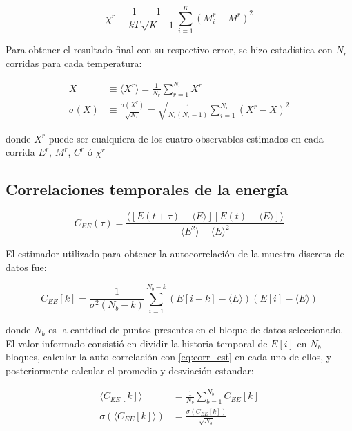 \documentclass[a4paper,12pt]{article}
\begin{document}
\begin{equation}
 \chi^r \equiv  \frac{1}{kT} \frac{1}{\sqrt{K-1}} \sum_{i=1}^K \left(
 M_i^r -  M^r \right)^2
\end{equation}

Para obtener el resultado final con su respectivo error, se hizo estadística 
con $N_r$ corridas para cada temperatura:

\begin{subequations}
\begin{align}
X & \equiv \langle X^r \rangle = \frac{1}{N_r} 
\sum_{r=1}^{N_r} X^r \\
\sigma(X) & \equiv \frac{\sigma(X^r)}{\sqrt{N_r}} =  \sqrt{\frac{1}{N_r(N_r-1)} 
\sum_{i=1}^{N_r} \left( 
 X^r -  X \right)^2}
\end{align}
\end{subequations}

\noindent donde $X^r$ puede ser cualquiera de los cuatro observables estimados 
en cada corrida $E^r$, $M^r$, $C^r$ ó $\chi^r$

\subsection{Correlaciones temporales de la energía}

\begin{equation}\label{eq:corr_teo}
C_{EE}(\tau) = \frac{\langle \left[E(t+\tau)-\langle 
E\rangle\right]\left[E(t)-\langle E \rangle\right] \rangle
}{\langle E^2\rangle - \langle E \rangle ^2}
\end{equation}

El estimador utilizado para obtener la autocorrelación de la muestra discreta 
de datos fue:

\begin{equation}\label{eq:corr_est}
C_{EE}[k] = \frac{1}{\sigma^2(N_b-k)} \sum_{i=1}^{N_b - k}\left(E[i+k] - 
\langle E \rangle\right)\left(E[i]-\langle E\rangle\right)
\end{equation}

\noindent donde $N_b$ es la cantdiad de puntos presentes en el bloque de datos 
seleccionado. El valor informado consistió en dividir la historia temporal de 
$E[i]$ en $N_b$ bloques, calcular la auto-correlación con \eqref{eq:corr_est} 
en cada uno de ellos, y posteriormente calcular el promedio y desviación 
estandar:

\begin{subequations}
\begin{align}
\langle C_{EE}[k]\rangle &= \frac{1}{N_b} \sum_{b=1}^{N_b} C_{EE}[k]\\
\sigma(\langle C_{EE}[k]\rangle) &= \frac{\sigma(C_{EE}[k])}{\sqrt{N_b}}
\end{align}
\end{subequations}
\end{document}
